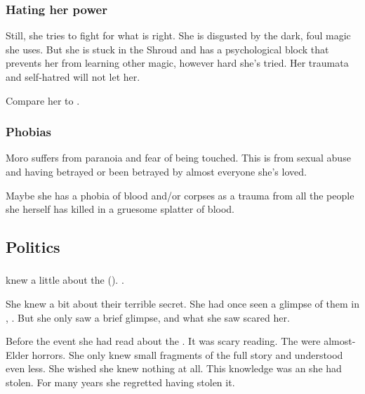\subsubsection{Hating her power}
Still, she tries to fight for what is right. She is disgusted by the dark, foul magic she uses. But she is stuck in the Shroud and has a psychological block that prevents her from learning other magic, however hard she's tried. Her traumata and self-hatred will not let her. 

Compare her to \SailorNothing. 





\subsubsection{Phobias}
Moro suffers from paranoia and fear of being touched. This is from sexual abuse and having betrayed or been betrayed by almost everyone she's loved. 

Maybe she has a phobia of blood and/or corpses as a trauma from all the people she herself has killed in a gruesome splatter of blood. 









\subsection{Politics}





\subsubsection{\QuilJaaran}
\MoroCobrel knew a little about the \quiljaaran (\quo{\serpentmen}). 
. 

She knew a bit about their terrible secret. 
She had once seen a glimpse of them in \Yormis, .
But she only saw a brief glimpse, and what she saw scared her.

Before the event she had read about the \serpentmen.
It was scary reading.
The \serpentmen were almost-\scathaese Elder horrors.
She only knew small fragments of the full story and understood even less.
She wished she knew nothing at all. 
This knowledge was an \arcanum she had stolen. 
For many years she regretted having stolen it. 

